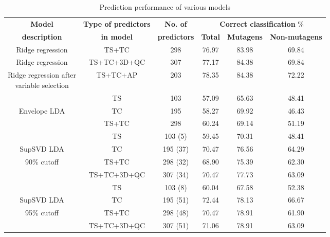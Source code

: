 \documentclass[11pt]{llncs}
\begin{document}
\begin{table}[t]\centering
    \begin{tabular}{|c|c|c|c|c|c|}
    \hline
    \textbf{Model}                                     & \textbf{Type of predictors} & \textbf{No. of}     & \multicolumn{3}{c|}{\textbf{Correct classification} \%}\\\cline{4-6}
    \textbf{description}                               & \textbf{in model}           & \textbf{predictors} & \quad\textbf{Total}  \quad                   & \textbf{Mutagens} & \textbf{Non-mutagens} \\ \hline
    Ridge regression\cite{hawk}                          & TS+TC              & 298        & 76.97                     & 83.98    & 69.84        \\ \hline
    Ridge regression\cite{hawk}                          & TS+TC+3D+QC        & 307        & 77.17                     & 84.38    & 69.84        \\ \hline
    \pbox{10cm}{Ridge regression after \\variable selection\cite{majum}} & TS+TC+AP           & 203        & 78.35                     & 84.38    & 72.22        \\ \hline\hline
                                  & TS                 & 103        & 57.09                     & 65.63    & 48.41        \\\cline{2-6}
    Envelope LDA                                         & TC                 & 195        & 58.27                     & 69.92    & 46.43        \\\cline{2-6}
    ~                                         & TS+TC              & 298          & 60.24 & 69.14        & 51.19            \\ \hline\hline
     & TS & 103 (5) & 59.45 & 70.31 & 48.41 \\\cline{2-6}
  SupSVD LDA   & TC & 195 (37) & 70.47 & 76.56 & 64.29 \\\cline{2-6}
  90\% cutoff  & TS+TC & 298 (32) & 68.90 & 75.39 & 62.30 \\\cline{2-6}
    & TS+TC+3D+QC & 307 (34) & 70.47 & 77.73 & 63.09 \\\hline\hline
    
     & TS & 103 (8) & 60.04 & 67.58 & 52.38 \\\cline{2-6}
  SupSVD LDA & TC & 195 (51) & 72.44 & 78.13 & 66.67 \\\cline{2-6}
  95\% cutoff  & TS+TC & 298 (48) & 70.47 & 78.91 & 61.90 \\\cline{2-6}
    & TS+TC+3D+QC & 307 (51) & 71.06 & 78.91 & 63.09 \\\hline
    \end{tabular}
    \caption{Prediction performance of various models}
\end{table}
\end{document}

